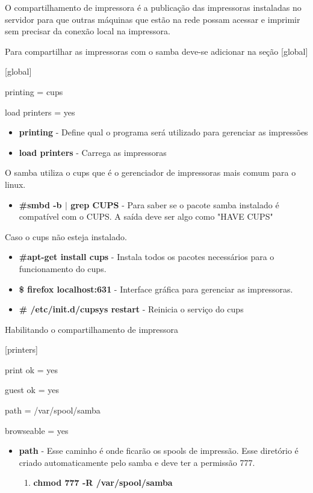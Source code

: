 O compartilhamento de impressora é a publicação das impressoras instaladas no servidor para que outras máquinas que estão na rede possam acessar e imprimir sem precisar da conexão local na impressora.

Para compartilhar as impressoras com o samba deve-se adicionar na seção [global] 

[global]

printing = cups

load printers = yes

\begin{itemize}
	\item \textbf{printing} - Define qual o programa será utilizado para gerenciar as impressões 
	\item \textbf{load printers} - Carrega as impressoras
\end{itemize}

O samba utiliza o cups que é o gerenciador de impressoras mais comum para o linux.

\begin{itemize}
	\item \textbf{\#smbd -b $|$ grep CUPS} - Para saber se o pacote samba instalado é compatível com o CUPS. A saída deve ser algo como "HAVE CUPS"
\end{itemize}

Caso o cups não esteja instalado.

\begin{itemize}
	\item \textbf{\#apt-get install cups} - Instala todos os pacotes necessários para o funcionamento do cups.
	\item \textbf{\$ firefox localhost:631} - Interface gráfica para gerenciar as impressoras.
	\item \textbf{\# /etc/init.d/cupsys restart} - Reinicia o serviço do cups
\end{itemize}

Habilitando o compartilhamento de impressora

[printers]

print ok = yes

guest ok = yes

path = /var/spool/samba

browseable = yes

\begin{itemize}
	\item \textbf{path} - Esse caminho é onde ficarão os spools de impressão. Esse diretório é criado automaticamente pelo samba e deve ter a permissão 777.
	\begin{enumerate}
		\item \textbf{chmod 777 -R /var/spool/samba}
	\end{enumerate}
\end{itemize}

